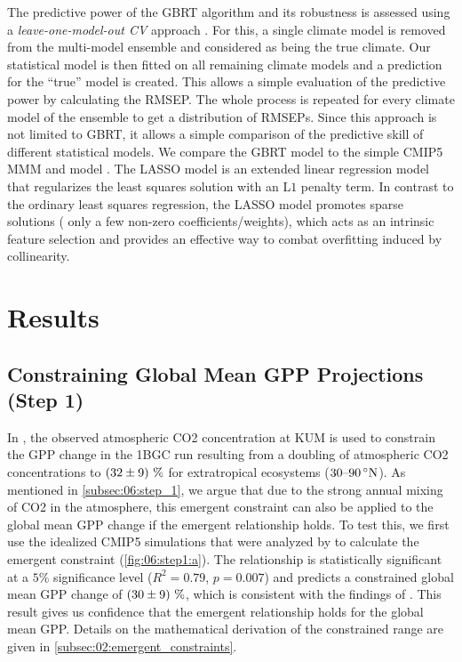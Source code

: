 The predictive power of the \ac{GBRT} algorithm and its robustness is assessed
using a \emph{leave-one-model-out \ac{CV}} approach . For this, a single climate model is
removed from the multi-model ensemble and considered as being the true
climate. Our statistical model is then fitted on all remaining climate models
and a prediction for the \enquote{true} model is created. This allows a
simple evaluation of the predictive power by calculating the \ac{RMSEP}. The
whole process is repeated for every climate model of the ensemble to get a
distribution of \acp{RMSEP}. Since this approach is not limited to \ac{GBRT},
it allows a simple comparison of the predictive skill of different
statistical models. We compare the \ac{GBRT} model to the simple \acs{CMIP}5
\acf{MMM} and  model \autocite{Tibshirani1996}. The \ac{LASSO}
model is an extended linear regression model that regularizes the least
squares solution with an L$1$ penalty term. In contrast to the ordinary least
squares regression, the \ac{LASSO} model promotes sparse solutions (\ie{}
only a few non-zero coefficients/weights), which acts as an intrinsic feature
selection and provides an effective way to combat overfitting induced by
collinearity.


\section{Results}
\label{sec:06:results}


\subsection{Constraining Global Mean \acs{GPP} Projections (Step 1)}
\label{subsec:06:results_step1}

In \textcite{Wenzel2016}, the observed atmospheric \ac{CO2} concentration at
\ac{KUM} \autocite{Keeling2005} is used to constrain the \ac{GPP} change in the
\ac{1BGC} run resulting from a doubling of atmospheric \ac{CO2} concentrations
to $\pmrangeunit{32}{9}{\%}$ for extratropical ecosystems
($\rangeunit{30}{90}{\degree N}$). As mentioned in \cref{subsec:06:step_1}, we
argue that due to the strong annual mixing of \ac{CO2} in the atmosphere, this
emergent constraint can also be applied to the global mean \ac{GPP} change if
the emergent relationship holds. To test this, we first use the idealized
\acs{CMIP}5 simulations that were analyzed by \textcite{Wenzel2016} to
calculate the emergent constraint (\cref{fig:06:step1:a}). The relationship is
statistically significant at a $5 \unit{\%}$ significance level ($R^2 = 0.79$,
$p = 0.007$) and predicts a constrained global mean \acs{GPP} change of
$\pmrangeunit{30}{9}{\%}$, which is consistent with the findings of
\textcite{Wenzel2016}. This result gives us confidence that the emergent
relationship holds for the global mean \ac{GPP}. Details on the mathematical
derivation of the constrained range are given in
\cref{subsec:02:emergent_constraints}.

